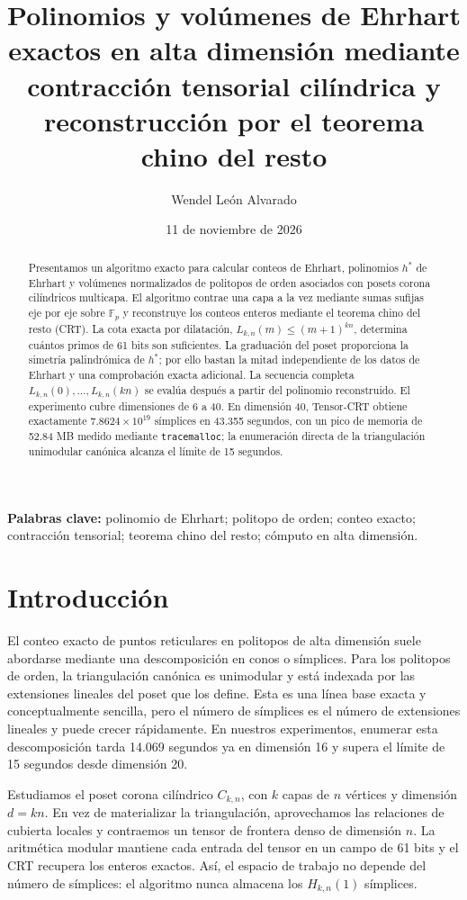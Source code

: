 \documentclass[11pt,a4paper]{article}
\title{Polinomios y volúmenes de Ehrhart exactos en alta dimensión mediante contracción tensorial cilíndrica y reconstrucción por el teorema chino del resto}
\author{Wendel León Alvarado}
\date{11 de noviembre de 2026}
\newcommand{\Fp}{\mathbb{F}_p}
\begin{document}
\maketitle

\begin{abstract}
Presentamos un algoritmo exacto para calcular conteos de Ehrhart,
polinomios $h^*$ de Ehrhart y volúmenes normalizados de politopos de orden
asociados con posets corona cilíndricos multicapa. El algoritmo contrae una
capa a la vez mediante sumas sufijas eje por eje sobre $\Fp$ y reconstruye
los conteos enteros mediante el teorema chino del resto (CRT). La cota exacta
por dilatación, $L_{k,n}(m)\leq(m+1)^{kn}$, determina cuántos primos de 61
bits son suficientes. La graduación del poset proporciona la simetría
palindrómica de $h^*$; por ello bastan la mitad independiente de los datos de
Ehrhart y una comprobación exacta adicional. La secuencia completa
$L_{k,n}(0),\ldots,L_{k,n}(kn)$ se evalúa después a partir del polinomio
reconstruido. El experimento cubre dimensiones de 6 a 40. En dimensión 40,
Tensor-CRT obtiene exactamente $7.8624\times10^{19}$ símplices en 43.355
segundos, con un pico de memoria de 52.84 MB medido mediante
\texttt{tracemalloc}; la enumeración directa de la triangulación unimodular
canónica alcanza el límite de 15 segundos.
\end{abstract}

\noindent\textbf{Palabras clave:}
polinomio de Ehrhart; politopo de orden; conteo exacto; contracción
tensorial; teorema chino del resto; cómputo en alta dimensión.

\section{Introducción}

El conteo exacto de puntos reticulares en politopos de alta dimensión suele
abordarse mediante una descomposición en conos o símplices. Para los
politopos de orden, la triangulación canónica es unimodular y está indexada
por las extensiones lineales del poset que los define. Esta es una línea
base exacta y conceptualmente sencilla, pero el número de símplices es el
número de extensiones lineales y puede crecer rápidamente. En nuestros
experimentos, enumerar esta descomposición tarda 14.069 segundos ya en
dimensión 16 y supera el límite de 15 segundos desde dimensión 20.

Estudiamos el poset corona cilíndrico $C_{k,n}$, con $k$ capas de $n$
vértices y dimensión $d=kn$. En vez de materializar la triangulación,
aprovechamos las relaciones de cubierta locales y contraemos un tensor de
frontera denso de dimensión $n$. La aritmética modular mantiene cada entrada
del tensor en un campo de 61 bits y el CRT recupera los enteros exactos.
Así, el espacio de trabajo no depende del número de símplices:
el algoritmo nunca almacena los $H_{k,n}(1)$ símplices.
\end{document}
